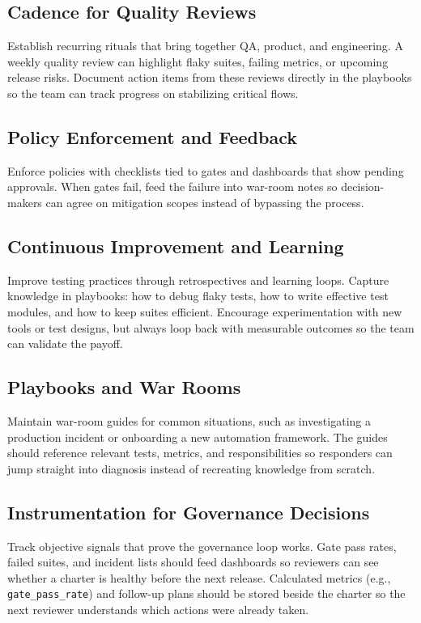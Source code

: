 \subsection{Cadence for Quality Reviews}

Establish recurring rituals that bring together QA, product, and engineering. A weekly quality review can highlight flaky suites, failing metrics, or upcoming release risks. Document action items from these reviews directly in the playbooks so the team can track progress on stabilizing critical flows.

\subsection{Policy Enforcement and Feedback}

Enforce policies with checklists tied to gates and dashboards that show pending approvals. When gates fail, feed the failure into war-room notes so decision-makers can agree on mitigation scopes instead of bypassing the process.

\subsection{Continuous Improvement and Learning}

Improve testing practices through retrospectives and learning loops. Capture knowledge in playbooks: how to debug flaky tests, how to write effective test modules, and how to keep suites efficient. Encourage experimentation with new tools or test designs, but always loop back with measurable outcomes so the team can validate the payoff.

\subsection{Playbooks and War Rooms}

Maintain war-room guides for common situations, such as investigating a production incident or onboarding a new automation framework. The guides should reference relevant tests, metrics, and responsibilities so responders can jump straight into diagnosis instead of recreating knowledge from scratch.

\subsection{Instrumentation for Governance Decisions}

Track objective signals that prove the governance loop works. Gate pass rates, failed suites, and incident lists should feed dashboards so reviewers can see whether a charter is healthy before the next release. Calculated metrics (e.g., \texttt{gate\_pass\_rate}) and follow-up plans should be stored beside the charter so the next reviewer understands which actions were already taken.

